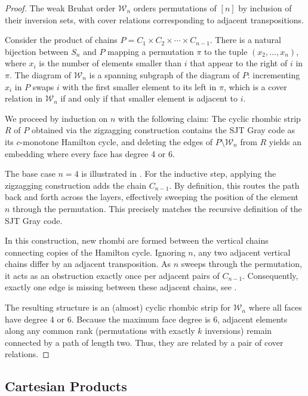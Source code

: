 \documentclass[fontsize=11pt,a4paper,DIV=12]{scrartcl}
\begin{document}
\weakBruhat*
\begin{proof}
    The weak Bruhat order $\mathcal{W}_n$ orders permutations of $[n]$ by inclusion of their inversion sets, with cover relations corresponding to adjacent transpositions. 
    
    Consider the product of chains $P = C_1 \times C_2 \times \cdots \times C_{n-1}$. There is a natural bijection between $S_n$ and $P$ mapping a permutation $\pi$ to the tuple $(x_2, \ldots, x_n)$, where $x_i$ is the number of elements smaller than $i$ that appear to the right of $i$ in $\pi$. The diagram of $\mathcal{W}_n$ is a spanning subgraph of the diagram of $P$: incrementing $x_i$ in $P$ swaps $i$ with the first smaller element to its left in $\pi$, which is a cover relation in $\mathcal{W}_n$ if and only if that smaller element is adjacent to $i$.

    We proceed by induction on $n$ with the following claim: The cyclic rhombic strip $R$ of $P$ obtained via the zigzagging construction contains the SJT Gray code as its $c$-monotone Hamilton cycle, and deleting the edges of $P \setminus \mathcal{W}_n$ from $R$ yields an embedding where every face has degree 4 or 6. 
    
    The base case $n=4$ is illustrated in . For the inductive step, applying the zigzagging construction adds the chain $C_{n-1}$. By definition, this routes the path back and forth across the layers, effectively sweeping the position of the element $n$ through the permutation. This precisely matches the recursive definition of the SJT Gray code. 

    In this construction, new rhombi are formed between the vertical chains connecting copies of the Hamilton cycle. Ignoring $n$, any two adjacent vertical chains differ by an adjacent transposition. As $n$ sweeps through the permutation, it acts as an obstruction exactly once per adjacent pairs of $C_{n-1}$. Consequently, exactly one edge is missing between these adjacent chains, see .

    The resulting structure is an (almost) cyclic rhombic strip for $\mathcal{W}_n$ where all faces have degree 4 or 6. Because the maximum face degree is 6, adjacent elements along any common rank (permutations with exactly $k$ inversions) remain connected by a path of length two. Thus, they are related by a pair of cover relations.
\end{proof}

\subsection{Cartesian Products}
\end{document}

